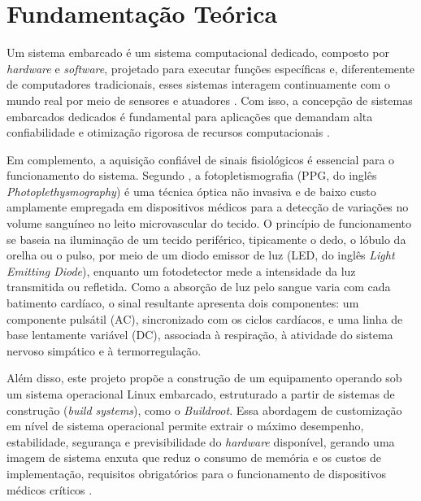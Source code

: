 \section{Fundamentação Teórica}
\label{fundamentao}


Um sistema embarcado é um sistema computacional dedicado, composto por \textit{hardware} e \textit{software}, projetado para executar funções específicas e, diferentemente de computadores tradicionais, esses sistemas interagem continuamente com o mundo real por meio de sensores e atuadores \cite{LEE200255}. Com isso, a concepção de sistemas embarcados dedicados é fundamental para aplicações que demandam alta confiabilidade e otimização rigorosa de recursos computacionais \cite{embedesSystem}. 

Em complemento, a aquisição confiável de sinais fisiológicos é essencial para o funcionamento do sistema. Segundo , a fotopletismografia (PPG, do inglês \textit{Photoplethysmography}) é uma técnica óptica não invasiva e de baixo custo amplamente empregada em dispositivos médicos para a detecção de variações no volume sanguíneo no leito microvascular do tecido. O princípio de funcionamento se baseia na iluminação de um tecido periférico, tipicamente o dedo, o lóbulo da orelha ou o pulso, por meio de um diodo emissor de luz (LED, do inglês \textit{Light Emitting Diode}), enquanto um fotodetector mede a intensidade da luz transmitida ou refletida. Como a absorção de luz pelo sangue varia com cada batimento cardíaco, o sinal resultante apresenta dois componentes: um componente pulsátil (AC), sincronizado com os ciclos cardíacos, e uma linha de base lentamente variável (DC), associada à respiração, à atividade do sistema nervoso simpático e à termorregulação.


Além disso, este projeto propõe a construção de um equipamento operando sob um sistema operacional Linux embarcado, estruturado a partir de sistemas de construção (\textit{build systems}), como o \textit{Buildroot}. Essa abordagem de customização em nível de sistema operacional permite extrair o máximo desempenho, estabilidade, segurança e previsibilidade do \textit{hardware} disponível, gerando uma imagem de sistema enxuta que reduz o consumo de memória e os custos de implementação, requisitos obrigatórios para o funcionamento de dispositivos médicos críticos \cite{pera2022buildroot, l4b2021linux}.

